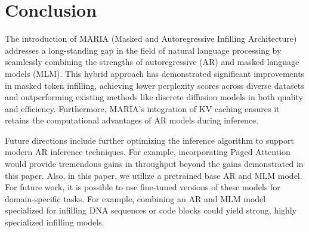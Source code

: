 \section{Conclusion}
The introduction of MARIA (Masked and Autoregressive Infilling Architecture) addresses a long-standing gap in the field of natural language processing by seamlessly combining the strengths of autoregressive (AR) and masked language models (MLM). This hybrid approach has demonstrated significant improvements in masked token infilling, achieving lower perplexity scores across diverse datasets and outperforming existing methods like discrete diffusion models in both quality and efficiency. Furthermore, MARIA's integration of KV caching ensures it retains the computational advantages of AR models during inference. 

Future directions include further optimizing the inference algorithm to support modern AR inference techniques. For example, incorporating Paged Attention \cite{kwon2023efficient} would provide tremendous gains in throughput beyond the gains demonstrated in this paper. Also, in this paper, we utilize a pretrained base AR and MLM model. For future work, it is possible to use fine-tuned versions of these models for domain-specific tasks. For example, combining an AR and MLM model specialized for infilling DNA sequences or code blocks could yield strong, highly specialized infilling models.

